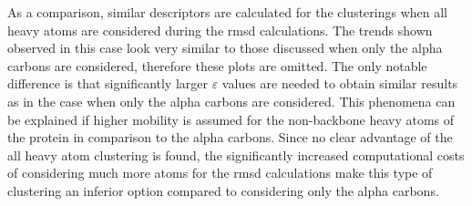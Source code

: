As a comparison, similar descriptors are calculated for the clusterings when all heavy atoms are considered during the \gls{rmsd} calculations.
The trends shown observed in this case look very similar to those discussed when only the alpha carbons are considered, therefore these plots are omitted.
The only notable difference is that significantly larger $\varepsilon$ values are needed to obtain similar results as in the case when only the alpha carbons are considered.
This phenomena can be explained if higher mobility is assumed for the non-backbone heavy atoms of the protein in comparison to the alpha carbons.
Since no clear advantage of the all heavy atom clustering is found, the significantly increased computational costs of considering much more atoms for the \gls{rmsd} calculations make this type of clustering an inferior option compared to considering only the alpha carbons.

